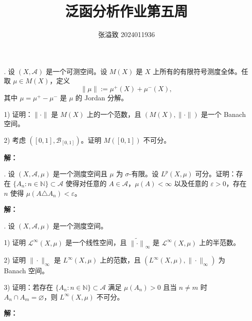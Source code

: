 \documentclass{article}
\title{泛函分析作业第五周}
\author{张溢致 2024011936}
\date{}
\begin{document}
\raggedbottom
\maketitle

\par\medskip{}. 设 $(X,\mathcal A)$ 是一个可测空间。设 $M(X)$ 是 $X$ 上所有的有限符号测度全体。任取 $\mu\in M(X)$，定义
\[
\|\mu\|:=\mu^+(X)+\mu^-(X),
\]
其中 $\mu=\mu^+-\mu^-$ 是 $\mu$ 的 Jordan 分解。

1) 证明：$\|\cdot\|$ 是 $M(X)$ 上的一个范数，且 $(M(X),\|\cdot\|)$ 是一个 Banach 空间。

2) 考虑 $([0,1],\mathcal B_{[0,1]})$。证明 $M([0,1])$ 不可分。


\par\nopagebreak[4]\noindent\textbf{解：}



\par\medskip

\par\medskip{}. 设 $(X,\mathcal A,\mu)$ 是一个测度空间且 $\mu$ 为 $\sigma$-有限。设 $L^p(X,\mu)$ 可分。证明：存在 $\{A_n:n\in\mathbb N\}\subset\mathcal A$ 使得对任意的 $A\in\mathcal A$，$\mu(A)<\infty$ 以及任意的 $\varepsilon>0$，存在 $n$ 使得 $\mu(A\triangle A_n)<\varepsilon$。


\par\nopagebreak[4]\noindent\textbf{解：}



\par\medskip

\par\medskip{}. 设 $(X,\mathcal A,\mu)$ 是一个测度空间。

1) 证明 $\mathcal L^\infty(X,\mu)$ 是一个线性空间，且 $\widetilde{\|\cdot\|}_\infty$ 是 $\mathcal L^\infty(X,\mu)$ 上的半范数。

2) 证明 $\|\cdot\|_\infty$ 是 $L^\infty(X,\mu)$ 上的范数，且 $(L^\infty(X,\mu),\|\cdot\|_\infty)$ 为 Banach 空间。

3) 证明：若存在 $\{A_n:n\in\mathbb N\}\subset\mathcal A$ 满足 $\mu(A_n)>0$ 且当 $n\ne m$ 时 $A_n\cap A_m=\varnothing$，则 $L^\infty(X,\mu)$ 不可分。


\par\nopagebreak[4]\noindent\textbf{解：}


\end{document}
